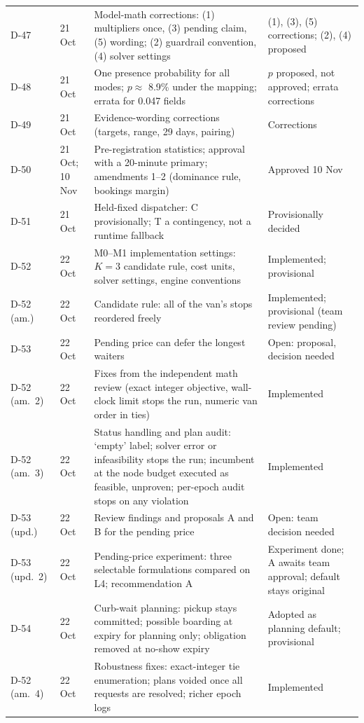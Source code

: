 \documentclass[11pt,letterpaper]{article}
\begin{document}
{\begin{longtable}{@{}P{1.25cm}P{1.45cm}P{8.0cm}P{3.0cm}@{}}
D-47 & 21 Oct & Model-math corrections: (1) multipliers once, (3) pending claim, (5) wording; (2) guardrail convention, (4) solver settings & (1), (3), (5) corrections; (2), (4) proposed\\
D-48 & 21 Oct & One presence probability for all modes; $p \approx$ 8.9\% under the mapping; errata for 0.047 fields & $p$ proposed, not approved; errata corrections\\
D-49 & 21 Oct & Evidence-wording corrections (targets, range, 29 days, pairing) & Corrections\\
D-50 & 21 Oct; 10 Nov & Pre-registration statistics; approval with a 20-minute primary; amendments 1--2 (dominance rule, bookings margin) & Approved 10 Nov\\
D-51 & 21 Oct & Held-fixed dispatcher: C provisionally; T a contingency, not a runtime fallback & Provisionally decided\\
D-52 & 22 Oct & M0--M1 implementation settings: $K = 3$ candidate rule, cost units, solver settings, engine conventions & Implemented; provisional\\
D-52 (am.) & 22 Oct & Candidate rule: all of the van's stops reordered freely & Implemented; provisional (team review pending)\\
D-53 & 22 Oct & Pending price can defer the longest waiters & Open: proposal, decision needed\\
D-52 (am.~2) & 22 Oct & Fixes from the independent math review (exact integer objective, wall-clock limit stops the run, numeric van order in ties) & Implemented\\
D-52 (am.~3) & 22 Oct & Status handling and plan audit: `empty' label; solver error or infeasibility stops the run; incumbent at the node budget executed as feasible, unproven; per-epoch audit stops on any violation & Implemented\\
D-53 (upd.) & 22 Oct & Review findings and proposals A and B for the pending price & Open: team decision needed\\
D-53 (upd.~2) & 22 Oct & Pending-price experiment: three selectable formulations compared on L4; recommendation A & Experiment done; A awaits team approval; default stays original\\
D-54 & 22 Oct & Curb-wait planning: pickup stays committed; possible boarding at expiry for planning only; obligation removed at no-show expiry & Adopted as planning default; provisional\\
D-52 (am.~4) & 22 Oct & Robustness fixes: exact-integer tie enumeration; plans voided once all requests are resolved; richer epoch logs & Implemented\\

\end{longtable}}
\end{document}
